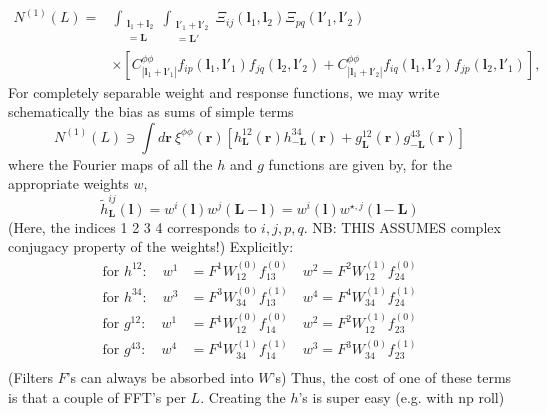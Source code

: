 \documentclass[11pt]{article}
\begin{document}
\newcommand{\bl}{\boldsymbol{l}}
\newcommand{\br}{\boldsymbol{r}}
\newcommand{\hn}[0]{{\hat n}}

\newcommand{\bll}{\boldsymbol{L}}
\newcommand{\intL}{\int_{\substack{\bl_1 + \bl_2 \\ =\bll }}}
\newcommand{\intLp}{\int_{\substack{\bl'_1 + \bl'_2 \\ =\bll' }}}

\begin{equation}
\begin{split}
N^{(1)}(L) = &\intL \intLp \Xi_{ij}(\bl_1, \bl_2) \Xi_{pq}(\bl'_1, \bl'_2) \\ &\times\left[ C^{\phi \phi}_{|\bl_1+\bl'_1|}f_{ip}(\bl_1, \bl'_1) f_{jq}(\bl_2, \bl'_2) + C^{\phi \phi}_{|\bl_1+\bl'_2|}f_{iq}(\bl_1, \bl'_2) f_{jp}(\bl_2, \bl'_1) \right] ,
\end{split}
\end{equation}
For completely separable weight and response functions, we may write schematically the bias as sums of simple terms   \color{black}
\begin{equation}
	N^{(1)}(L) \ni  \int d\br\: \xi^{\phi \phi}(\br)\left[ h^{12}_{\bll}(\br) h^{34}_{-\bll}(\br) + g^{12}_{\bll}(\br) g^{43}_{-\bll}(\br)\right ]
\end{equation}
where the Fourier maps of all the $h$ and $g$ functions are given by, for the appropriate weights $w$,
\begin{equation}
	\tilde h^{ij}_{\bll}(\bl) =  w^i(\bl) w^j(\bll - \bl) = w^i(\bl) w^{\star, j}(\bl - \bll)
\end{equation}
(Here, the indices 1 2 3 4 corresponds to $i,j,p,q$. NB: THIS ASSUMES complex conjugacy property of the weights!)
Explicitly:
\begin{equation}
\begin{split}
\textrm{for }h^{12}:\quad w^1 &= F^1 W_{12}^{(0)} f^{(0)}_{13}	\quad w^2 = F^2W_{12}^{(1)}f^{(0)}_{24} \\
\textrm{for }h^{34}:\quad w^3 &= F^3 W_{34}^{(0)} f^{(1)}_{13}	\quad w^4 = F^4W_{34}^{(1)}f^{(1)}_{24} \\
\textrm{for }g^{12}:\quad w^1 &= F^1 W_{12}^{(0)} f^{(0)}_{14}	\quad w^2 = F^2W_{12}^{(1)}f^{(0)}_{23} \\
\textrm{for }g^{43}:\quad w^4 &= F^4 W_{34}^{(1)} f^{(1)}_{14}	\quad w^3 = F^3W_{34}^{(0)}f^{(1)}_{23} \\
\end{split}
\end{equation}
(Filters $F$'s can always be absorbed into $W$'s)
Thus, the cost of one of these terms is that a couple of FFT's per $L$. Creating the $h$'s is super easy (e.g. with np roll)
\end{document}
